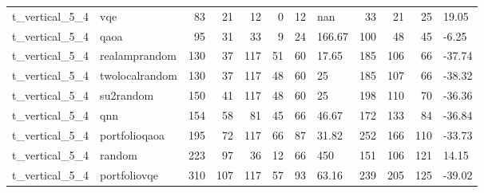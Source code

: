 \begin{longtable}{llrrrrrlrrrl}
t\_vertical\_5\_4 & vqe & 83 & 21 & 12 & 0 & 12 & nan & 33 & 21 & 25 & 19.05 \\
t\_vertical\_5\_4 & qaoa & 95 & 31 & 33 & 9 & 24 & 166.67 & 100 & 48 & 45 & -6.25 \\
t\_vertical\_5\_4 & realamprandom & 130 & 37 & 117 & 51 & 60 & 17.65 & 185 & 106 & 66 & -37.74 \\
t\_vertical\_5\_4 & twolocalrandom & 130 & 37 & 117 & 48 & 60 & 25 & 185 & 107 & 66 & -38.32 \\
t\_vertical\_5\_4 & su2random & 150 & 41 & 117 & 48 & 60 & 25 & 198 & 110 & 70 & -36.36 \\
t\_vertical\_5\_4 & qnn & 154 & 58 & 81 & 45 & 66 & 46.67 & 172 & 133 & 84 & -36.84 \\
t\_vertical\_5\_4 & portfolioqaoa & 195 & 72 & 117 & 66 & 87 & 31.82 & 252 & 166 & 110 & -33.73 \\
t\_vertical\_5\_4 & random & 223 & 97 & 36 & 12 & 66 & 450 & 151 & 106 & 121 & 14.15 \\
t\_vertical\_5\_4 & portfoliovqe & 310 & 107 & 117 & 57 & 93 & 63.16 & 239 & 205 & 125 & -39.02 \\
\end{longtable}
